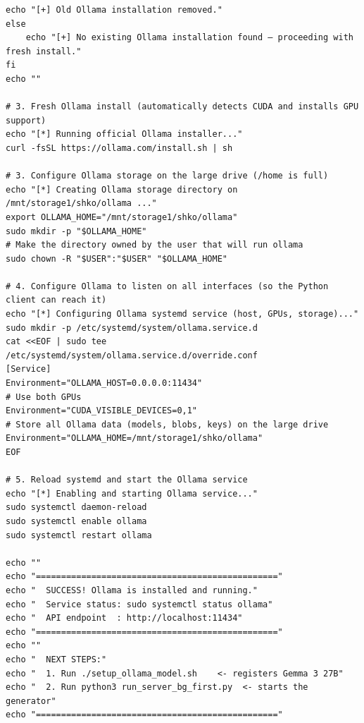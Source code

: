 \documentclass[11pt]{article}
\begin{document}
\begin{lstlisting}[style=bashstyle, caption={install\_ollama.sh}]
    echo "[+] Old Ollama installation removed."
else
    echo "[+] No existing Ollama installation found — proceeding with fresh install."
fi
echo ""

# 3. Fresh Ollama install (automatically detects CUDA and installs GPU support)
echo "[*] Running official Ollama installer..."
curl -fsSL https://ollama.com/install.sh | sh

# 3. Configure Ollama storage on the large drive (/home is full)
echo "[*] Creating Ollama storage directory on /mnt/storage1/shko/ollama ..."
export OLLAMA_HOME="/mnt/storage1/shko/ollama"
sudo mkdir -p "$OLLAMA_HOME"
# Make the directory owned by the user that will run ollama
sudo chown -R "$USER":"$USER" "$OLLAMA_HOME"

# 4. Configure Ollama to listen on all interfaces (so the Python client can reach it)
echo "[*] Configuring Ollama systemd service (host, GPUs, storage)..."
sudo mkdir -p /etc/systemd/system/ollama.service.d
cat <<EOF | sudo tee /etc/systemd/system/ollama.service.d/override.conf
[Service]
Environment="OLLAMA_HOST=0.0.0.0:11434"
# Use both GPUs
Environment="CUDA_VISIBLE_DEVICES=0,1"
# Store all Ollama data (models, blobs, keys) on the large drive
Environment="OLLAMA_HOME=/mnt/storage1/shko/ollama"
EOF

# 5. Reload systemd and start the Ollama service
echo "[*] Enabling and starting Ollama service..."
sudo systemctl daemon-reload
sudo systemctl enable ollama
sudo systemctl restart ollama

echo ""
echo "================================================"
echo "  SUCCESS! Ollama is installed and running."
echo "  Service status: sudo systemctl status ollama"
echo "  API endpoint  : http://localhost:11434"
echo "================================================"
echo ""
echo "  NEXT STEPS:"
echo "  1. Run ./setup_ollama_model.sh    <- registers Gemma 3 27B"
echo "  2. Run python3 run_server_bg_first.py  <- starts the generator"
echo "================================================"
\end{lstlisting}

\newpage
\end{document}
